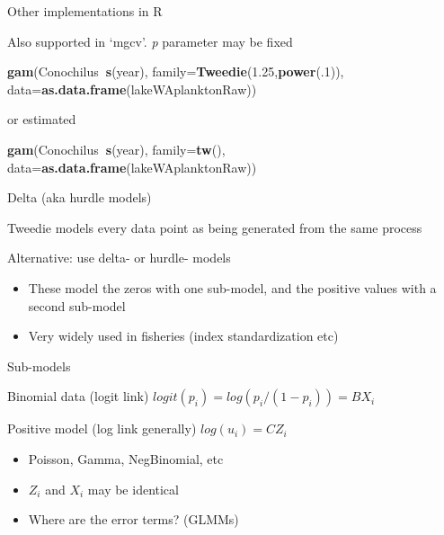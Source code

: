 \documentclass[ignorenonframetext,]{beamer}
\newenvironment{Shaded}{\begin{snugshade}}{\end{snugshade}}
\newcommand{\DataTypeTok}[1]{\textcolor[rgb]{0.13,0.29,0.53}{#1}}
\newcommand{\DecValTok}[1]{\textcolor[rgb]{0.00,0.00,0.81}{#1}}
\newcommand{\FloatTok}[1]{\textcolor[rgb]{0.00,0.00,0.81}{#1}}
\newcommand{\KeywordTok}[1]{\textcolor[rgb]{0.13,0.29,0.53}{\textbf{#1}}}
\newcommand{\NormalTok}[1]{#1}
\newcommand{\OperatorTok}[1]{\textcolor[rgb]{0.81,0.36,0.00}{\textbf{#1}}}
\providecommand{\tightlist}{%
  \setlength{\itemsep}{0pt}\setlength{\parskip}{0pt}}
\begin{document}
\begin{frame}[fragile]{Other implementations in R}
\protect\hypertarget{other-implementations-in-r}{}

Also supported in `mgcv'. \emph{p} parameter may be fixed

\begin{Shaded}
\begin{Highlighting}[]
\KeywordTok{gam}\NormalTok{(Conochilus}\OperatorTok{~}\KeywordTok{s}\NormalTok{(year), }\DataTypeTok{family=}\KeywordTok{Tweedie}\NormalTok{(}\FloatTok{1.25}\NormalTok{,}\KeywordTok{power}\NormalTok{(.}\DecValTok{1}\NormalTok{)),}
  \DataTypeTok{data=}\KeywordTok{as.data.frame}\NormalTok{(lakeWAplanktonRaw))}
\end{Highlighting}
\end{Shaded}

or estimated

\begin{Shaded}
\begin{Highlighting}[]
\KeywordTok{gam}\NormalTok{(Conochilus}\OperatorTok{~}\KeywordTok{s}\NormalTok{(year), }\DataTypeTok{family=}\KeywordTok{tw}\NormalTok{(),}
  \DataTypeTok{data=}\KeywordTok{as.data.frame}\NormalTok{(lakeWAplanktonRaw))}
\end{Highlighting}
\end{Shaded}

\end{frame}

\begin{frame}{Delta (aka hurdle models)}
\protect\hypertarget{delta-aka-hurdle-models}{}

Tweedie models every data point as being generated from the same process

Alternative: use delta- or hurdle- models

\begin{itemize}
\item
  These model the zeros with one sub-model, and the positive values with
  a second sub-model
\item
  Very widely used in fisheries (index standardization etc)
\end{itemize}

\end{frame}

\begin{frame}{Sub-models}
\protect\hypertarget{sub-models}{}

Binomial data (logit link) \(logit(p_i) = log(p_i/(1-p_i)) = BX_i\)

Positive model (log link generally) \(log(u_i) = CZ_i\)

\begin{itemize}
\tightlist
\item
  Poisson, Gamma, NegBinomial, etc
\item
  \(Z_i\) and \(X_i\) may be identical
\item
  Where are the error terms? (GLMMs)
\end{itemize}

\end{frame}
\end{document}
